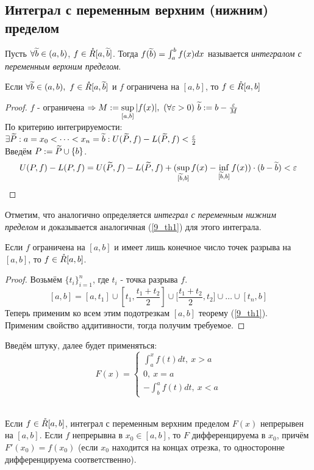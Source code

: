 \subsection{Интеграл с переменным верхним (нижним) пределом}
\begin{definition}
	Пусть $\forall\widetilde b\in(a,b)$, $f\in\mathring R[a,\widetilde b]$. Тогда $f(\widetilde b)=\int_a^bf(x)dx$ называется \textit{интегралом с переменным верхним пределом}.
\end{definition}
\begin{theorem}\label{9_th1}
	Если $\forall\widetilde b\in(a,b),\ f\in\mathring R[a,\widetilde b]$ и $f$ ограничена на $[a,b]$, то $f\in\mathring R[a,b]$
\end{theorem}
\begin{proof}
	$f$ - ограничена $\Ra M:=\sup_{[a,b]}|f(x)|,\ (\fa\eps>0)\ \t b:=b-\frac\eps M$\\
	По критерию интегрируемости: $\exists\widetilde P:a=x_0<\dots<x_n=\widetilde b:U(\widetilde P,f)-L(\widetilde P,f)<\frac{\varepsilon}2$\\
	Введём $P:=\widetilde P\cup\{b\}$.
	\[U(P,f)-L(P,f)=U(\t P,f)-L(\t P,f)+(\sup_{[\t b,b]}f(x)-\inf_{[\t b,b]}f(x))\cdot(b-\t b)<\eps\]
\end{proof}
\begin{note}
	Отметим, что аналогично определяется \textit{интеграл с переменным нижним пределом} и доказывается аналогичная (\ref{9_th1}) для этого интеграла.
\end{note}
\begin{corollary}
	Если $f$ ограничена на $[a,b]$ и имеет лишь конечное число точек разрыва на $[a,b]$, то $f\in\mathring R[a,b]$.
\end{corollary}
\begin{proof}
	Возьмём $\{t_i\}_{i=1}^n$, где $t_i$ - точка разрыва $f$.\\
	\[[a,b]=[a,t_1]\cup\left[t_1,\frac{t_1+t_2}2\right]\cup\bigg[\frac{t_1+t_2}2,t_2\bigg]\cup\dots\cup[t_n,b]\]
	Теперь применим ко всем этим подотрезкам $[a,b]$ теорему (\ref{9_th1}).\\
	Применим свойство аддитивности, тогда получим требуемое.
\end{proof}
\begin{note}
	Введём штуку, далее будет применяться:
	\[
	F(x)=
	\begin{cases}
		\int_a^xf(t)dt,\ x>a\\
		0,\ x=a\\
		-\int_b^af(t)dt,\ x<a
	\end{cases}
	\]
\end{note}
\begin{theorem}\label{9_th2}\\
	Если $f\in\mathring R[a,b]$, интеграл с переменным верхним пределом $F(x)$ непрерывен на $[a,b]$. Если $f$ непрерывна в $x_0\in[a,b]$, то $F$ дифференцируема в $x_0$, причём $F'(x_0)=f(x_0)$ (если $x_0$ находится на концах отрезка, то односторонне дифференцируема соответственно).
\end{theorem}
